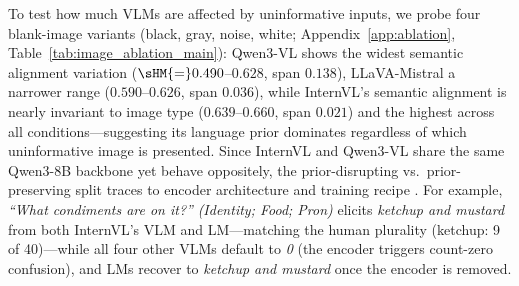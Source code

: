 To test how much VLMs are affected by uninformative inputs, we probe four blank-image variants (black, gray, noise, white; Appendix~\ref{app:ablation}, Table~\ref{tab:image_ablation_main}): Qwen3-VL shows the widest semantic alignment variation ($\sHM{=}0.490$--$0.628$, span $0.138$), LLaVA-Mistral a narrower range ($0.590$--$0.626$, span $0.036$), while InternVL's semantic alignment is nearly invariant to image type ($0.639$--$0.660$, span $0.021$) and the highest across all conditions---suggesting its language prior dominates regardless of which uninformative image is presented.
Since InternVL and Qwen3-VL share the same Qwen3-8B backbone yet behave oppositely, the prior-disrupting vs.\ prior-preserving split traces to encoder architecture and training recipe \citep{tong2024eyes,mckinzie2024mm1}.
For example, \textit{``What condiments are on it?''} \emph{(Identity; Food; Pron)} elicits \textit{ketchup and mustard} from both InternVL's VLM and LM---matching the human plurality (ketchup: 9 of 40)---while all four other VLMs default to \textit{0} (the encoder triggers count-zero confusion), and LMs recover to \textit{ketchup and mustard} once the encoder is removed. %

